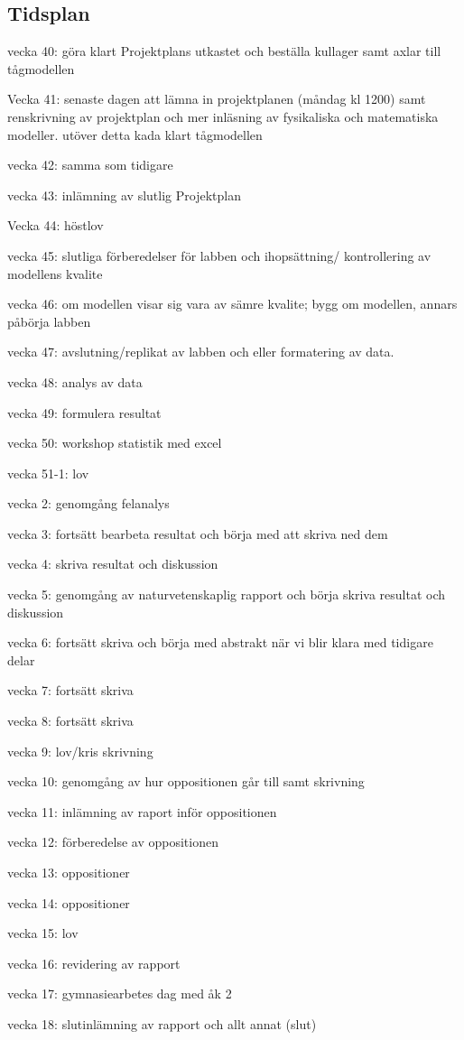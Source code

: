 \subsection{Tidsplan}
vecka 40:
göra klart Projektplans utkastet och beställa kullager samt axlar till tågmodellen

Vecka 41: senaste dagen att lämna in projektplanen (måndag kl 1200) samt renskrivning av projektplan och mer inläsning av fysikaliska och matematiska modeller. utöver detta kada klart tågmodellen

vecka 42: samma som tidigare

vecka 43: inlämning av slutlig Projektplan

Vecka 44: höstlov

vecka 45: slutliga förberedelser för labben och ihopsättning/ kontrollering av modellens kvalite

vecka 46: om modellen visar sig vara av sämre kvalite; bygg om modellen, annars påbörja labben

vecka 47: avslutning/replikat av labben och eller formatering av data.

vecka 48: analys av data

vecka 49: formulera resultat

vecka 50: workshop statistik med excel

vecka 51-1: lov

vecka 2: genomgång felanalys

vecka 3: fortsätt bearbeta resultat och börja med att skriva ned dem

vecka 4: skriva resultat och diskussion

vecka 5: genomgång av naturvetenskaplig rapport och börja skriva resultat och diskussion

vecka 6: fortsätt skriva och börja med abstrakt när vi blir klara med tidigare delar

vecka 7: fortsätt skriva

vecka 8: fortsätt skriva

vecka 9: lov/kris skrivning

vecka 10: genomgång av hur oppositionen går till samt skrivning

vecka 11: inlämning av raport inför oppositionen

vecka 12: förberedelse av oppositionen

vecka 13: oppositioner

vecka 14: oppositioner

vecka 15: lov

vecka 16: revidering av rapport

vecka 17: gymnasiearbetes dag med åk 2

vecka 18: slutinlämning av rapport och allt annat (slut)